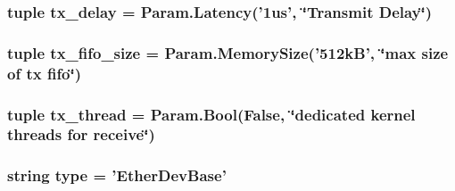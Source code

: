 \label{classEthernet_1_1EtherDevBase_aefe87c7b07351d14e344d05f9f8b032d}
\hypertarget{classEthernet_1_1EtherDevBase_a92a53dd964a9a188a986bd77a968c268}{
\subsubsection[{tx\_\-delay}]{\setlength{\rightskip}{0pt plus 5cm}tuple {\bf tx\_\-delay} = Param.Latency('1us', \char`\"{}Transmit Delay\char`\"{})}}
\label{classEthernet_1_1EtherDevBase_a92a53dd964a9a188a986bd77a968c268}
\hypertarget{classEthernet_1_1EtherDevBase_ade05cdf962b2bfb207d5c864432949b8}{
\subsubsection[{tx\_\-fifo\_\-size}]{\setlength{\rightskip}{0pt plus 5cm}tuple {\bf tx\_\-fifo\_\-size} = Param.MemorySize('512kB', \char`\"{}max size of tx fifo\char`\"{})}}
\label{classEthernet_1_1EtherDevBase_ade05cdf962b2bfb207d5c864432949b8}
\hypertarget{classEthernet_1_1EtherDevBase_a760c350751ad51c9c6631ee83d0d49b2}{
\subsubsection[{tx\_\-thread}]{\setlength{\rightskip}{0pt plus 5cm}tuple {\bf tx\_\-thread} = Param.Bool(False, \char`\"{}dedicated kernel threads for receive\char`\"{})}}
\label{classEthernet_1_1EtherDevBase_a760c350751ad51c9c6631ee83d0d49b2}
\hypertarget{classEthernet_1_1EtherDevBase_acce15679d830831b0bbe8ebc2a60b2ca}{
\subsubsection[{type}]{\setlength{\rightskip}{0pt plus 5cm}string {\bf type} = '{\bf EtherDevBase}'}}
\label{classEthernet_1_1EtherDevBase_acce15679d830831b0bbe8ebc2a60b2ca}


